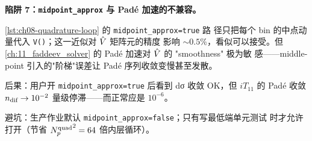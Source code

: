 \begin{pitfallbox}
\textbf{陷阱 7：\texttt{midpoint\_approx} 与 Padé 加速的不兼容。}

\cref{lst:ch08-quadrature-loop} 的 \texttt{midpoint\_approx=true} 路
径只把每个 bin 的中点动量代入 \texttt{V()}；这一近似对 \(\hat{V}\) 矩阵元的精度
影响 \(\sim 0.5\%\)，看似可以接受。但
\cref{ch:11_faddeev_solver} 的 Padé 加速对 \(\hat{V}\) 的 "smoothness" 极为敏
感——middle-point 引入的"阶梯"误差让 Padé 序列收敛变慢甚至发散。

后果：用户开 \texttt{midpoint\_approx=true} 后看到 dσ 收敛 OK，但
\(iT_{11}\) 的 Padé 收敛 \(n_{\text{dif}} \to 10^{-2}\) 量级停滞——而正常应是
\(10^{-6}\)。

避坑：生产作业默认 \texttt{midpoint\_approx=false}；只有写最低端单元测试
时才允许打开（节省 \({N_{p}^{\text{quad}}}^2 = 64\) 倍内层循环）。
\end{pitfallbox}
